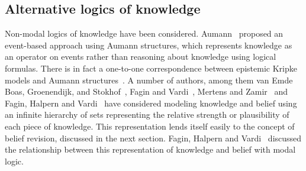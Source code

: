 \subsection{Alternative logics of knowledge}

Non-modal logics of knowledge have been considered. 
Aumann~\cite{aumann:1976} proposed an event-based approach using Aumann structures, which represents knowledge as an operator on events rather than reasoning about knowledge using logical formulas.
There is in fact a one-to-one correspondence between epistemic Kripke models and Aumann structures~\cite{fagin:1995}.
A number of authors, among them van Emde Boas, Groenendijk, and Stokhof~\cite{vanemdeboas:1980}, Fagin and Vardi~\cite{fagin:1985}, Mertens and Zamir~\cite{mertens:1985} and Fagin, Halpern and Vardi~\cite{fagin:1991} have considered modeling knowledge and belief using an infinite hierarchy of sets representing the relative strength or plausibility of each piece of knowledge.
This representation lends itself easily to the concept of belief revision, discussed in the next section.
Fagin, Halpern and Vardi~\cite{fagin:1991} discussed the relationship between this representation of knowledge and belief with modal logic.  




